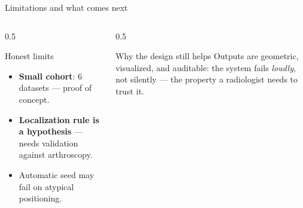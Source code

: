 \begin{frame}{Limitations and what comes next}
  \begin{columns}[T]
    \begin{column}{0.5\textwidth}
      \begin{block}{Honest limits}
        \begin{itemize}\small
          \item \textbf{Small cohort}: 6 datasets --- proof of concept.
          \item \textbf{Localization rule is a hypothesis} --- needs validation against arthroscopy.
          \item Automatic seed may fail on atypical positioning.
        \end{itemize}
      \end{block}
    \end{column}
    \begin{column}{0.5\textwidth}
      \begin{block}{Why the design still helps}
        Outputs are \alert{geometric, visualized, and auditable}: the system fails \emph{loudly}, not silently --- the property a radiologist needs to trust it.
      \end{block}
    \end{column}
  \end{columns}
\end{frame}

